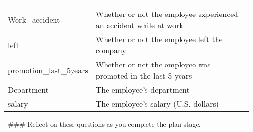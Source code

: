 \documentclass[11pt]{article}
\begin{document}
\begin{longtable}[]{@{}ll@{}}
\begin{minipage}[t]{0.47\columnwidth}
\end{minipage}\tabularnewline
\begin{minipage}[t]{0.47\columnwidth}\raggedright
Work\_accident\strut
\end{minipage} & \begin{minipage}[t]{0.47\columnwidth}\raggedright
Whether or not the employee experienced an accident while at work\strut
\end{minipage}\tabularnewline
\begin{minipage}[t]{0.47\columnwidth}\raggedright
left\strut
\end{minipage} & \begin{minipage}[t]{0.47\columnwidth}\raggedright
Whether or not the employee left the company\strut
\end{minipage}\tabularnewline
\begin{minipage}[t]{0.47\columnwidth}\raggedright
promotion\_last\_5years\strut
\end{minipage} & \begin{minipage}[t]{0.47\columnwidth}\raggedright
Whether or not the employee was promoted in the last 5 years\strut
\end{minipage}\tabularnewline
\begin{minipage}[t]{0.47\columnwidth}\raggedright
Department\strut
\end{minipage} & \begin{minipage}[t]{0.47\columnwidth}\raggedright
The employee's department\strut
\end{minipage}\tabularnewline
\begin{minipage}[t]{0.47\columnwidth}\raggedright
salary\strut
\end{minipage} & \begin{minipage}[t]{0.47\columnwidth}\raggedright
The employee's salary (U.S. dollars)\strut
\end{minipage}\tabularnewline
\bottomrule
\end{longtable}

    💭 \#\#\# Reflect on these questions as you complete the plan stage.
\end{document}
